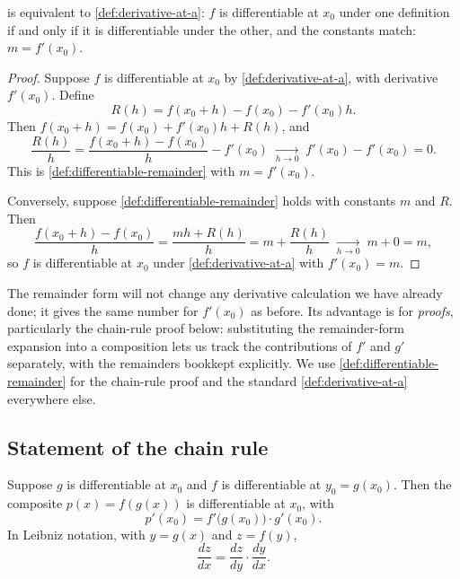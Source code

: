 \begin{proposition}\label{prop:def-equivalence}
 is equivalent to \cref{def:derivative-at-a}: \(f\) is differentiable at \(x_{0}\) under one definition if and only if it is differentiable under the other, and the constants match: \(m = f'(x_{0})\).
\end{proposition}

\begin{proof}
Suppose \(f\) is differentiable at \(x_{0}\) by \cref{def:derivative-at-a}, with derivative \(f'(x_{0})\). Define
\[
R(h) = f(x_{0} + h) - f(x_{0}) - f'(x_{0}) h.
\]
Then \(f(x_{0} + h) = f(x_{0}) + f'(x_{0}) h + R(h)\), and
\[
\frac{R(h)}{h} = \frac{f(x_{0} + h) - f(x_{0})}{h} - f'(x_{0}) \;\xrightarrow[h \to 0]{}\; f'(x_{0}) - f'(x_{0}) = 0.
\]
This is \cref{def:differentiable-remainder} with \(m = f'(x_{0})\).

Conversely, suppose \cref{def:differentiable-remainder} holds with constants \(m\) and \(R\). Then
\[
\frac{f(x_{0} + h) - f(x_{0})}{h} = \frac{m h + R(h)}{h} = m + \frac{R(h)}{h} \;\xrightarrow[h \to 0]{}\; m + 0 = m,
\]
so \(f\) is differentiable at \(x_{0}\) under \cref{def:derivative-at-a} with \(f'(x_{0}) = m\).
\end{proof}

\begin{remark}
The remainder form will not change any derivative calculation we have already done; it gives the same number for \(f'(x_{0})\) as before. Its advantage is for \emph{proofs}, particularly the chain-rule proof below: substituting the remainder-form expansion into a composition lets us track the contributions of \(f'\) and \(g'\) separately, with the remainders bookkept explicitly. We use \cref{def:differentiable-remainder} for the chain-rule proof and the standard \cref{def:derivative-at-a} everywhere else.
\end{remark}

\subsection{Statement of the chain rule}

\begin{theorem}\label{thm:chain-rule}
Suppose \(g\) is differentiable at \(x_{0}\) and \(f\) is differentiable at \(y_{0} = g(x_{0})\). Then the composite \(p(x) = f(g(x))\) is differentiable at \(x_{0}\), with
\[
p'(x_{0}) = f'\!\bigl(g(x_{0})\bigr) \cdot g'(x_{0}).
\]
In Leibniz notation, with \(y = g(x)\) and \(z = f(y)\),
\[
\frac{dz}{dx} = \frac{dz}{dy} \cdot \frac{dy}{dx}.
\]
\end{theorem}

